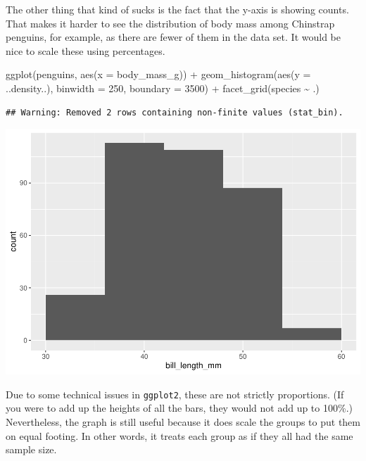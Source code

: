 \documentclass[
]{book}
\newenvironment{Shaded}{\begin{snugshade}}{\end{snugshade}}
\newcommand{\AttributeTok}[1]{\textcolor[rgb]{0.77,0.63,0.00}{#1}}
\newcommand{\DecValTok}[1]{\textcolor[rgb]{0.00,0.00,0.81}{#1}}
\newcommand{\FunctionTok}[1]{\textcolor[rgb]{0.00,0.00,0.00}{#1}}
\newcommand{\NormalTok}[1]{#1}
\newcommand{\SpecialCharTok}[1]{\textcolor[rgb]{0.00,0.00,0.00}{#1}}
\begin{document}
The other thing that kind of sucks is the fact that the y-axis is showing counts. That makes it harder to see the distribution of body mass among Chinstrap penguins, for example, as there are fewer of them in the data set. It would be nice to scale these using percentages.

\begin{Shaded}
\begin{Highlighting}[]
\FunctionTok{ggplot}\NormalTok{(penguins, }\FunctionTok{aes}\NormalTok{(}\AttributeTok{x =}\NormalTok{ body\_mass\_g)) }\SpecialCharTok{+}
    \FunctionTok{geom\_histogram}\NormalTok{(}\FunctionTok{aes}\NormalTok{(}\AttributeTok{y =}\NormalTok{ ..density..),}
                   \AttributeTok{binwidth =} \DecValTok{250}\NormalTok{, }\AttributeTok{boundary =} \DecValTok{3500}\NormalTok{) }\SpecialCharTok{+}
    \FunctionTok{facet\_grid}\NormalTok{(species }\SpecialCharTok{\textasciitilde{}}\NormalTok{ .)}
\end{Highlighting}
\end{Shaded}

\begin{verbatim}
## Warning: Removed 2 rows containing non-finite values (stat_bin).
\end{verbatim}

\includegraphics{intro_stats_files/figure-latex/unnamed-chunk-109-1.pdf}

Due to some technical issues in \texttt{ggplot2}, these are not strictly proportions. (If you were to add up the heights of all the bars, they would not add up to 100\%.) Nevertheless, the graph is still useful because it does scale the groups to put them on equal footing. In other words, it treats each group as if they all had the same sample size.
\end{document}
